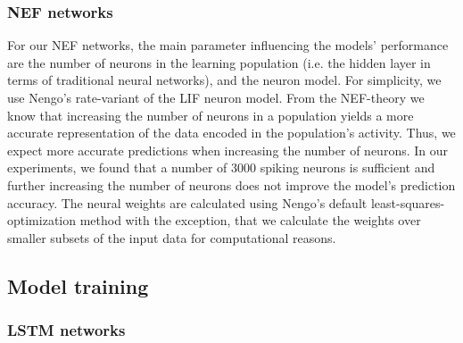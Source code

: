 \subsubsection{\ac{NEF} networks}
\label{subsubsec:hyperparam_nef}

For our \ac{NEF} networks, the main parameter influencing the models' performance are the number of neurons in the learning population (i.e. the hidden layer in terms of traditional neural networks), and the neuron model.
For simplicity, we use \acs{Nengo}'s rate-variant of the \ac{LIF} neuron model.
From the \ac{NEF}-theory \cite{Eliasmith2003} we know that increasing the number of neurons in a population yields a more accurate representation of the data encoded in the population's activity.
Thus, we expect more accurate predictions when increasing the number of neurons.
In our experiments, we found that a number of \num{3000} spiking neurons is sufficient and further increasing the number of neurons does not improve the model's prediction accuracy.
The neural weights are calculated using \acs{Nengo}'s default least-squares-optimization method with the exception, that we calculate the weights over smaller subsets of the input data for computational reasons.

\subsection{Model training}
\label{subsec:model_train}
\subsubsection{\ac{LSTM} networks}
\label{subsubsec:train_lstm}

